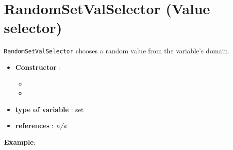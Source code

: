 \section{RandomSetValSelector (Value selector)}\label{randomsetvalselector:randomsetvalselectorvalselector}\hypertarget{randomsetvalselector:randomsetvalselectorvalselector}{}
\begin{notedef}
  \texttt{RandomSetValSelector} chooses a random value from the variable's domain.
\end{notedef}

\begin{itemize}
	\item \textbf{Constructor} : 
		\begin{itemize}
		\item {}
		\item {}
		\end{itemize}
	\item \textbf{type of variable} : set
	\item \textbf{references} : \emph{n/a}
\end{itemize}

\textbf{Example}:
%

